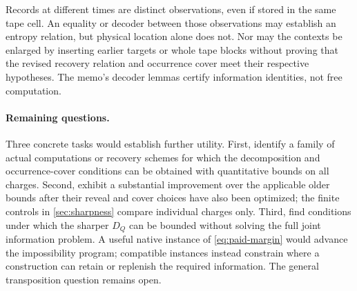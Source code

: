 Records at different times are distinct observations, even if stored in
the same tape cell. An equality or decoder between those observations
may establish an entropy relation, but physical location alone does
not. Nor may the contexts be enlarged by inserting earlier targets or
whole tape blocks without proving that the revised recovery relation
and occurrence cover meet their respective hypotheses. The memo's
decoder lemmas certify information identities, not free computation.

\paragraph{Remaining questions.}
Three concrete tasks would establish further utility. First, identify
a family of actual computations or recovery schemes for which the
decomposition and occurrence-cover conditions can be obtained with
quantitative bounds on all charges. Second, exhibit a substantial
improvement over the applicable older bounds after their reveal and
cover choices have also been optimized; the finite controls in
\cref{sec:sharpness} compare individual charges only. Third, find
conditions under which the sharper $D_Q$ can be bounded without solving
the full joint information problem. A useful native instance of
\eqref{eq:paid-margin} would advance the impossibility program;
compatible instances instead constrain where a construction can
retain or replenish the required information. The general transposition
question remains open.

